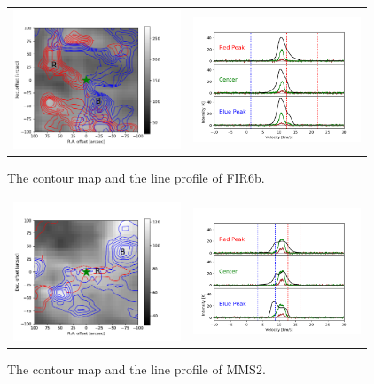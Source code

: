 \documentclass[twoside,11pt]{gshs_thesis}
\begin{document}
\begin{figure}[h!]
	\begin{center}
		\begin{tabular}{cc}
			\includegraphics[width=5cm]{Orion_12CO2-1_FIR6b_rbcontour_400_modified.png} &   \includegraphics[width=5cm]{Orion_12CO2-1_FIR6b_line_profile_400.png}\\
		\end{tabular}
		\label{FIR6b21}
		\caption{The contour map and the line profile of FIR6b. }
	\end{center}
\end{figure}

\begin{figure}[h!]
	\begin{center}
		\begin{tabular}{cc}
			\includegraphics[width=5cm]{Orion_12CO2-1_MMS2_rbcontour_400_modified.png} &   \includegraphics[width=5cm]{Orion_12CO2-1_MMS2_line_profile_400.png} \\
		\end{tabular}
		\label{MMS221}
		\caption{The contour map and the line profile of MMS2. }
	\end{center}
\end{figure}
\end{document}
